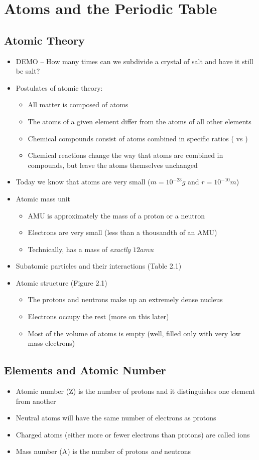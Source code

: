 \documentclass[12pt, openany, letterpaper]{memoir}
\begin{document}
\chapter{Atoms and the Periodic Table}%
\section{Atomic Theory}
\begin{itemize}
	\item DEMO -- How many times can we subdivide a crystal of salt and have it still be salt?
	\item Postulates of atomic theory:
	\begin{itemize}
		\item All matter is composed of atoms
		\item The atoms of a given element differ from the atoms of all other elements
		\item Chemical compounds consist of atoms combined in specific ratios ( vs )
		\item Chemical reactions change the way that atoms are combined in compounds, but leave the atoms themselves unchanged
	\end{itemize}
	\item Today we know that atoms are very small ($m=10^{-23}g$ and $r=10^{-10}m$)
	\item Atomic mass unit
	\begin{itemize}
		\item AMU is approximately the mass of a proton or a neutron
		\item Electrons are very small (less than a thousandth of an AMU)
		\item Technically,  has a mass of \emph{exactly} $12amu$
	\end{itemize}
	\item Subatomic particles and their interactions (Table 2.1)
	\item Atomic structure (Figure 2.1)
	\begin{itemize}
		\item The protons and neutrons make up an extremely dense nucleus
		\item Electrons occupy the rest (more on this later)
		\item Most of the volume of atoms is empty (well, filled only with very low mass electrons)
	\end{itemize}
\end{itemize}
\section{Elements and Atomic Number}
\begin{itemize}
	\item Atomic number (Z) is the number of protons and it distinguishes one element from another
	\item Neutral atoms will have the same number of electrons as protons
	\item Charged atoms (either more or fewer electrons than protons) are called ions
	\item Mass number (A) is the number of protons \emph{and} neutrons	
\end{itemize}
\end{document}
